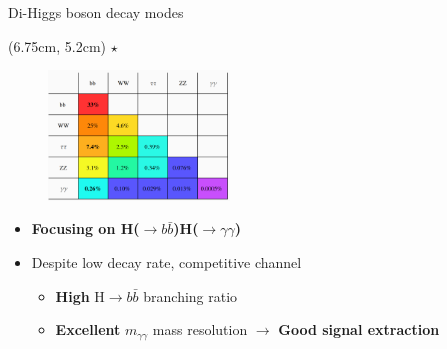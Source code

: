 \begin{frame}{Di-Higgs boson decay modes}
\begin{textblock*}{5cm}(6.75cm, 5.2cm) %
  \textcolor{HHred}{\textbf{$\star$}}
\end{textblock*}

\begin{figure}
    \centering
    \includegraphics[width=0.43\textwidth]{Part1/Img/HH_decays2.png}
\end{figure}
\pause
\begin{itemize}
    \item \textbf{\textcolor{HHred}{Focusing on H($\to b\bar{b}$)H($\to\gamma\gamma$)}}
    \item Despite low decay rate, competitive channel
    \begin{itemize}
        \item \textbf{High} H$\to b\bar{b}$ branching ratio
        \item \textbf{Excellent} $m_{\gamma\gamma}$ mass resolution $\to$ \textbf{Good signal extraction}
    
    \end{itemize}
\end{itemize}

\end{frame}